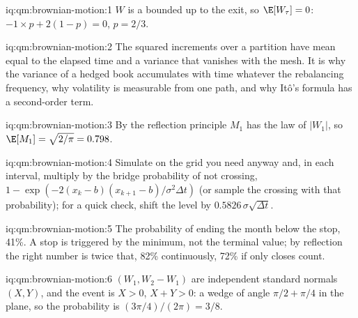\begin{solution}{iq:qm:brownian-motion:1}
$W$ is a bounded  up to the exit, so $\E[W_\tau] = 0$: $-1 \times p + 2(1 - p) = 0$,
$p = 2/3$.
\end{solution}

\begin{solution}{iq:qm:brownian-motion:2}
The squared increments over a partition have mean equal to the elapsed time and a variance
that vanishes with the mesh. It is why the variance of a hedged book accumulates with time
whatever the rebalancing frequency, why volatility is measurable from one path, and why
Itô's formula has a second-order term.
\end{solution}

\begin{solution}{iq:qm:brownian-motion:3}
By the reflection principle $M_1$ has the law of $|W_1|$, so $\E[M_1] = \sqrt{2/\pi} = 0.798$.
\end{solution}

\begin{solution}{iq:qm:brownian-motion:4}
Simulate on the grid you need anyway and, in each interval, multiply by the bridge
probability of not crossing, $1 - \exp(-2(x_k - b)(x_{k+1} - b)/\sigma^2\Delta t)$ (or sample the
crossing with that probability); for a quick check, shift the level by $0.5826\,\sigma\sqrt{\Delta t}$.
\end{solution}

\begin{solution}{iq:qm:brownian-motion:5}
The probability of ending the month below the stop, 41\%. A stop is triggered by the minimum,
not the terminal value; by reflection the right number is twice that, 82\% continuously, 72\%
if only closes count.
\end{solution}

\begin{solution}{iq:qm:brownian-motion:6}
$(W_1, W_2 - W_1)$ are independent standard normals $(X, Y)$, and the event is $X > 0$, $X + Y >
0$: a wedge of angle $\pi/2 + \pi/4$ in the plane, so the probability is $(3\pi/4)/(2\pi) = 3/8$.
\end{solution}
